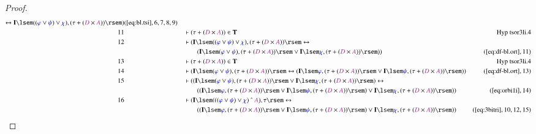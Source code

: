 \begin{proof}
\begin{align}
      \leftrightarrow \mathbf{I} \lsem ( ( \mw{\varphi}
      \vee \mw{\psi} ) \vee \mw{\chi} ) , ( \tau + ( \mc{D}
      \times \mc{A} ) ) \rsem
      )&(\mbox{\ref{eq:bl.tsi}},6,7,8,9)\notag
  \\ 11 &&  & \vdash ( \tau + ( \mc{D} \times \mc{A} ) ) \in
      \mathbf{T}&\text{Hyp~tsor3li.4}\notag%
  \\ 12 &&  & \vdash ( \mathbf{I} \lsem ( ( \mw{\varphi} \vee \mw{\psi} ) \vee
      \mw{\chi} ) , ( \tau + ( \mc{D} \times \mc{A} ) )
      \rsem \leftrightarrow  \notag \\ & & & \qquad
     ( \mathbf{I} \lsem (
      \mw{\varphi} \vee \mw{\psi} ) , ( \tau + ( \mc{D}
      \times \mc{A} ) ) \rsem \vee \mathbf{I} \lsem
      \mw{\chi} , ( \tau + ( \mc{D} \times \mc{A} ) ) \rsem
      ) )&(\mbox{\ref{eq:df-bl.ort}},11)\notag
  \\ 13 &&  & \vdash ( \tau + ( \mc{D} \times \mc{A} ) ) \in
      \mathbf{T}&\text{Hyp~tsor3li.4}\notag%
  \\ 14 &&  & \vdash ( \mathbf{I} \lsem ( \mw{\varphi} \vee \mw{\psi} ) , (
      \tau + ( \mc{D} \times \mc{A} ) ) \rsem
      \leftrightarrow ( \mathbf{I} \lsem \mw{\varphi} , (
      \tau + ( \mc{D} \times \mc{A} ) ) \rsem \vee
      \mathbf{I} \lsem \mw{\psi} , ( \tau + ( \mc{D} \times
      \mc{A} ) ) \rsem )
      )&(\mbox{\ref{eq:df-bl.ort}},13)\notag
  \\ 15 &&  & \vdash ( ( \mathbf{I} \lsem ( \mw{\varphi} \vee \mw{\psi} ) , (
      \tau + ( \mc{D} \times \mc{A} ) ) \rsem \vee
      \mathbf{I} \lsem \mw{\chi} , ( \tau + ( \mc{D} \times
      \mc{A} ) ) \rsem ) \leftrightarrow  \notag \\ & & & \qquad
     ( ( \mathbf{I}
      \lsem \mw{\varphi} , ( \tau + ( \mc{D} \times \mc{A} )
      ) \rsem \vee \mathbf{I} \lsem \mw{\psi} , ( \tau + (
      \mc{D} \times \mc{A} ) ) \rsem ) \vee \mathbf{I} \lsem
      \mw{\chi} , ( \tau + ( \mc{D} \times \mc{A} ) ) \rsem
      ) )&(\mbox{\ref{eq:orbi1i}},14)\notag
  \\ 16 &&  & \vdash ( \mathbf{I} \lsem ( ( ( \mw{\varphi} \vee \mw{\psi} )
      \vee \mw{\chi} ) ~\string^~ \mc{A} ) , \tau \rsem
      \leftrightarrow  \notag \\ & & & \qquad
     ( ( \mathbf{I} \lsem \mw{\varphi} , (
      \tau + ( \mc{D} \times \mc{A} ) ) \rsem \vee
      \mathbf{I} \lsem \mw{\psi} , ( \tau + ( \mc{D} \times
      \mc{A} ) ) \rsem ) \vee \mathbf{I} \lsem \mw{\chi} ,
      ( \tau + ( \mc{D} \times \mc{A} ) ) \rsem )
      )&(\mbox{\ref{eq:3bitri}},10,12,15)\notag

\end{align}
\end{proof}
